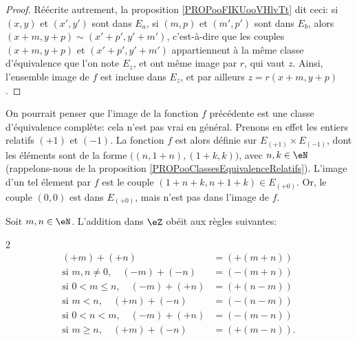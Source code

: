\begin{proof}
	Réécrite autrement, la proposition \ref{PROPooFIKUooVHlvTt} dit ceci: si \( (x,y) \) et \( (x', y') \) sont dans \( E_a \), si \( (m,p) \) et \( (m',p')\) sont dans \( E_b \), alors \( (x+m,y+p) \sim (x'+p',y'+m') \), c'est-à-dire que les couples \( (x+m,y+p) \) et \( (x'+p',y'+m') \) appartiennent à la même classe d'équivalence que l'on note \( E_z \), et ont même image par \( r \), qui vaut \( z \). Ainsi, l'ensemble image de \( f \) est incluse dans \( E_z \), et par ailleurs \( z = r(x+m,y+p) \).
\end{proof}

\begin{remark}	\label{REMooAdditionEntiersRelatifs}
	On pourrait penser que l'image de la fonction \( f \) précédente est une classe d'équivalence complète: cela n'est pas vrai en général. Prenons en effet les entiers relatifs \( (+1) \) et \( (-1) \). La fonction \( f \) est alors définie sur \( E_{(+1)} \times E_{(-1)} \), dont les éléments sont de la forme \( \big( (n, 1+n), (1+k, k)\big) \), avec \( n, k \in \eN \) (rappelons-nous de la proposition \ref{PROPooClassesEquivalenceRelatifs}). L'image d'un tel élement par \( f \) est le couple \( (1+n+k, n+1+k) \in E_{(+0)} \). Or, le couple \( (0,0) \) est dans \(E_{(+0)} \), mais n'est pas dans l'image de \( f \).
\end{remark}

\begin{corollary}	\label{CORooAdditionRelatifsRegleSignes}
	Soit \( m, n \in \eN \). L'addition dans \( \eZ \) obéit aux règles suivantes:
 	\begin{multicols}2
  	\begin{align}
  		(+m) + (+n) &= (+ (m+n) )	\label{SEQooAdditionRelatifsPP}\\
		\text{si } m, n \neq 0,\quad (-m) + (-n) &= (-(m+n))	\label{SEQooAdditionRelatifsMM}\\
		\text{si }0 < m \leq n,\quad (-m) + (+n) &= (+(n-m))	\label{SEQooAdditionRelatifsMPP}\\
  		\text{si }m < n,\quad (+m) + (-n) &= (-(n-m))	\label{SEQooAdditionRelatifsPMM}\\
		\text{si }0 < n < m,\quad (-m) + (+n) &= (-(m-n))	\label{SEQooAdditionRelatifsMPM}\\
  		\text{si }m \geq n, \quad (+m) + (-n) &= (+(m-n)).	\label{SEQooAdditionRelatifsPMP}
  	\end{align}
   \end{multicols}
\end{corollary}

